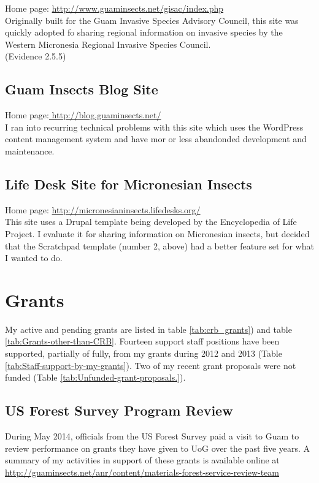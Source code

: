 \documentclass[12pt,oneside,english]{scrbook}
\begin{document}
Home page: \url{http://www.guaminsects.net/gisac/index.php}\\
Originally built for the Guam Invasive Species Advisory Council, this
site was quickly adopted fo sharing regional information on invasive
species by the Western Micronesia Regional Invasive Species Council.\\
(Evidence 2.5.5)

\subsection{Guam Insects Blog Site}

Home page:\url{ http://blog.guaminsects.net/} \\
I ran into recurring technical problems with this site which uses
the WordPress content management system and have mor or less abandonded
development and maintenance.

\subsection{Life Desk Site for Micronesian Insects}

Home page: \url{http://micronesianinsects.lifedesks.org/}\\
This site uses a Drupal template being developed by the Encyclopedia
of Life Project. I evaluate it for sharing information on Micronesian
insects, but decided that the Scratchpad template (number 2, above)
had a better feature set for what I wanted to do.


\section{Grants}

My active and pending grants are listed in table \ref{tab:crb_grants})
and table \ref{tab:Grants-other-than-CRB}. Fourteen support staff
positions have been supported, partially of fully, from my grants
during 2012 and 2013 (Table \ref{tab:Staff-support-by-my-grants}).
Two of my recent grant proposals were not funded (Table \ref{tab:Unfunded-grant-proposals.}).

\subsection{US Forest Survey Program Review}

During May 2014, officials from the US Forest Survey paid a visit
to Guam to review performance on grants they have given to UoG over
the past five years. A summary of my activities in support of these
grants is available online at \url{http://guaminsects.net/anr/content/materials-forest-service-review-team}
\end{document}
